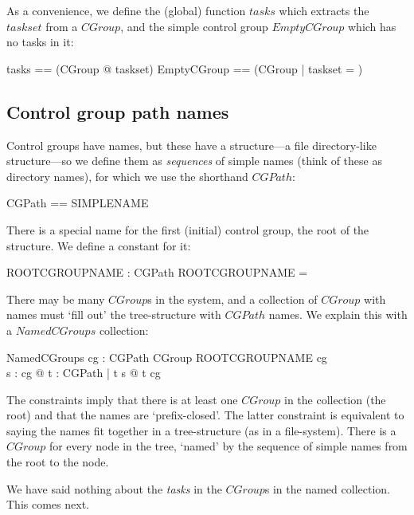 \documentclass[a4paper,twoside,12pt]{article}
\begin{document}
As a convenience, we define the (global) function $tasks$ which extracts the $taskset$ from a $CGroup$, and the
simple control group $EmptyCGroup$ which has no tasks in it:
\begin{zed}
tasks == (\lambda CGroup @ taskset)
\also
EmptyCGroup == (\mu CGroup | taskset = \emptyset )
\end{zed}

\subsection{Control group path names}

Control groups have names, but these have a structure---a file directory-like structure---so we define them as \emph{sequences} of simple names 
(think of these as directory names), for which we use the shorthand $CGPath$:

\begin{zed}
CGPath == \seq SIMPLENAME
\end{zed}

There is a special name for the first (initial) control group, the root of the structure. We define a constant for it:

\begin{axdef}{}
ROOTCGROUPNAME : CGPath
\where
ROOTCGROUPNAME = \langle \rangle
\end{axdef}

There may be many $CGroup$s in the system, and a collection of $CGroup$ with names must `fill out' the tree-structure with $CGPath$ names. 
We explain this with a $NamedCGroups$ collection:

\begin{schema}{NamedCGroups}
cg : CGPath \ffun CGroup
\where
ROOTCGROUPNAME \in \dom cg \\
\forall s : \dom cg @ \forall t : CGPath | t \subset s @ t \in \dom cg
\end{schema}
The constraints imply that there is  at least one $CGroup$ in the collection (the root) and that the names are `prefix-closed'. The latter constraint is equivalent to saying the names fit together in a tree-structure (as in a file-system).
There is a $CGroup$ for every node in the tree, `named' by the sequence of simple names from the root to the node.

We have said nothing about the \emph{tasks} in the $CGroup$s in the named collection.
This comes next.
\end{document}
